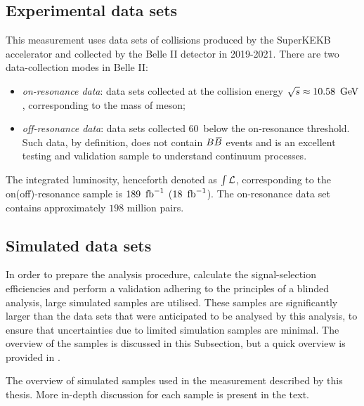 
\subsection{Experimental data sets}\label{sec:data}

This measurement uses data sets of \epem collisions produced by the SuperKEKB accelerator and collected by the Belle II detector in 2019-2021.
There are two data-collection modes in Belle II:
\begin{itemize}
    \item \textit{on-resonance data}: data sets collected at the collision energy $\sqrt{s}\approx10.58~\mathrm{\,Ge\kern -0.1em V}$, corresponding to the mass of \FourS meson;
    \item \textit{off-resonance data}: data sets collected 60~\mev below the on-resonance threshold. 
    Such data, by definition, does not contain $B\kern 0.18em\overline{\kern -0.18em B}{}$ events and is an excellent testing and validation sample to understand continuum processes.
\end{itemize}
The integrated luminosity, henceforth denoted as $\int~\hspace{-7pt}~\mathcal{L}$, corresponding to the on(off)-resonance sample is $189~\mbox{\,fb}^{-1}$ ($18~\mbox{\,fb}^{-1}$).
The on-resonance data set contains approximately $198$ million \BB pairs.

\subsection{Simulated data sets}\label{sec:MC}

In order to prepare the analysis procedure, calculate the signal-selection efficiencies and perform a validation adhering to the principles of a blinded analysis, 
large simulated samples are utilised.
These samples are significantly larger than the data sets that were anticipated to be analysed by this analysis, to ensure that uncertainties due to limited simulation samples are minimal.
The overview of the samples is discussed in this Subsection, but a quick overview is provided in .

\begin{table}[hbtp!]
    \centering
\caption{\label{tab:simulated_samples}The overview of simulated samples used in the measurement described by this thesis.
More in-depth discussion for each sample is present in the text.}

\end{table}

